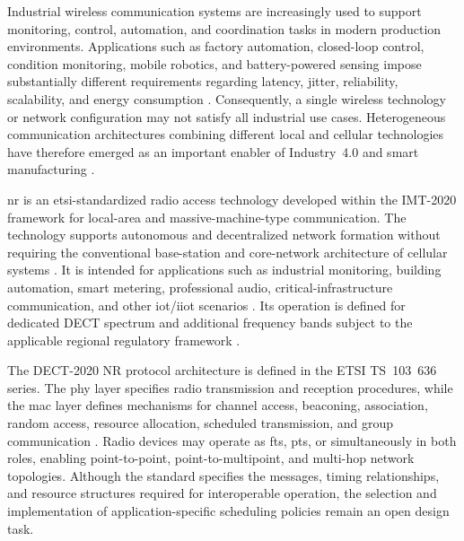 \documentclass[12pt,a4paper]{article}
\begin{document}
Industrial wireless communication systems are increasingly used to support monitoring, control, automation, and coordination tasks in modern production environments. Applications such as factory automation, closed-loop control, condition monitoring, mobile robotics, and battery-powered sensing impose substantially different requirements regarding latency, jitter, reliability, scalability, and energy consumption \cite{willigWirelessTechnologyIndustrial2005,vitturiIndustrialWirelessNetworks2013,wollschlaegerFutureIndustrialCommunication2017a}. Consequently, a single wireless technology or network configuration may not satisfy all industrial use cases. Heterogeneous communication architectures combining different local and cellular technologies have therefore emerged as an important enabler of Industry~4.0 and smart manufacturing \cite{alizaiHeterogeneousCommunicationNetworks2023a,karrenbauerFutureIndustrialNetworking2019a,aschenbrennerFlexiCell5GLocationbased2022a}.

\gls{nr} is an \gls{etsi}-standardized radio access technology developed within the IMT-2020 framework for local-area and massive-machine-type communication. The technology supports autonomous and decentralized network formation without requiring the conventional base-station and core-network architecture of cellular systems \cite{kovalchukovDECT2020NewRadio2022,perez-guiraoDECTNRUnveiling2022}. It is intended for applications such as industrial monitoring, building automation, smart metering, professional audio, critical-infrastructure communication, and other \gls{iot}/\gls{iiot} scenarios \cite{durreDECT2020NRProfessional2024,poetsProfessionalNetworkedAudio2025,biswasReliableLowLatencyCommunications2024}. Its operation is defined for dedicated DECT spectrum and additional frequency bands subject to the applicable regional regulatory framework \cite{etsi_tr103943}.

The DECT-2020 NR protocol architecture is defined in the ETSI TS~103~636 series. The \gls{phy} layer specifies radio transmission and reception procedures, while the \gls{mac} layer defines mechanisms for channel access, beaconing, association, random access, resource allocation, scheduled transmission, and group communication \cite{etsi_ts103636_1,etsi_ts103636_3,etsi_ts103636_4}. Radio devices may operate as \glspl{ft}, \glspl{pt}, or simultaneously in both roles, enabling point-to-point, point-to-multipoint, and multi-hop network topologies. Although the standard specifies the messages, timing relationships, and resource structures required for interoperable operation, the selection and implementation of application-specific scheduling policies remain an open design task.
\end{document}
